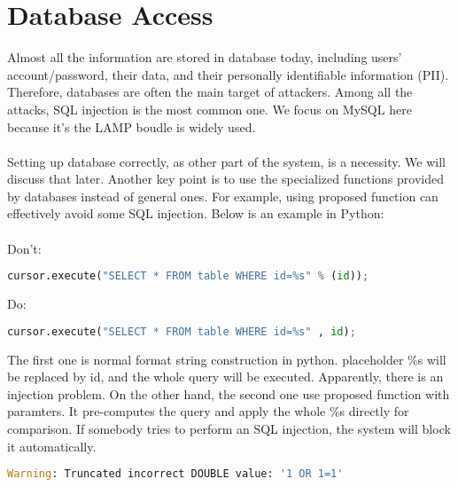 \documentclass[10pt, a4paper]{article}
\begin{document}
\section{Database Access}
Almost all the information are stored in database today,
including users' account/password, their data, and their
personally identifiable information (PII).
Therefore,
databases are often the main target of attackers.
Among all the attacks, SQL injection is the most common one.
We focus on MySQL here because it's the LAMP \cite{LAMP} boudle is widely used.
\\\\
Setting up database correctly, as other part of the system, is a necessity.
We will discuss that later.
Another key point is to use the specialized functions provided by databases
instead of general ones. For example, using proposed function can effectively
avoid some SQL injection. Below is an example in Python:
\\\\
Don't:
\begin{lstlisting}[language=python]
cursor.execute("SELECT * FROM table WHERE id=%s" % (id));
\end{lstlisting}
Do:
\begin{lstlisting}[language=python]
cursor.execute("SELECT * FROM table WHERE id=%s" , id);
\end{lstlisting}
The first one is normal format string construction in python.
placeholder \%s will be replaced by id,
and the whole query will be executed.
Apparently, there is an injection problem.
On the other hand,
the second one use proposed function with paramters.
It pre-computes the query and apply the whole \%s directly for comparison.
If somebody tries to perform an SQL injection, the system will block it automatically.
\begin{lstlisting}[language=python]
Warning: Truncated incorrect DOUBLE value: '1 OR 1=1'
\end{lstlisting}
\end{document}
